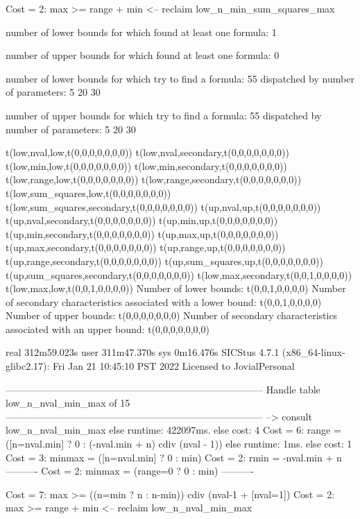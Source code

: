Cost =  2:  max >= range + min
<-- reclaim low_n_min_sum_squares_max

number of lower bounds for which found at least one formula: 1

number of upper bounds for which found at least one formula: 0

number of lower bounds for which try to find a formula: 55
dispatched by number of parameters: 5  20  30

number of upper bounds for which try to find a formula: 55
dispatched by number of parameters: 5  20  30

t(low,nval,low,t(0,0,0,0,0,0,0))
t(low,nval,secondary,t(0,0,0,0,0,0,0))
t(low,min,low,t(0,0,0,0,0,0,0))
t(low,min,secondary,t(0,0,0,0,0,0,0))
t(low,range,low,t(0,0,0,0,0,0,0))
t(low,range,secondary,t(0,0,0,0,0,0,0))
t(low,sum_squares,low,t(0,0,0,0,0,0,0))
t(low,sum_squares,secondary,t(0,0,0,0,0,0,0))
t(up,nval,up,t(0,0,0,0,0,0,0))
t(up,nval,secondary,t(0,0,0,0,0,0,0))
t(up,min,up,t(0,0,0,0,0,0,0))
t(up,min,secondary,t(0,0,0,0,0,0,0))
t(up,max,up,t(0,0,0,0,0,0,0))
t(up,max,secondary,t(0,0,0,0,0,0,0))
t(up,range,up,t(0,0,0,0,0,0,0))
t(up,range,secondary,t(0,0,0,0,0,0,0))
t(up,sum_squares,up,t(0,0,0,0,0,0,0))
t(up,sum_squares,secondary,t(0,0,0,0,0,0,0))
t(low,max,secondary,t(0,0,1,0,0,0,0))
t(low,max,low,t(0,0,1,0,0,0,0))
Number of lower bounds:                                             t(0,0,1,0,0,0,0)
Number of secondary characteristics associated with a lower bound:  t(0,0,1,0,0,0,0)
Number of upper bounds:                                             t(0,0,0,0,0,0,0)
Number of secondary characteristics associated with an upper bound: t(0,0,0,0,0,0,0)

real	312m59.023s
user	311m47.370s
sys	0m16.476s
SICStus 4.7.1 (x86_64-linux-glibc2.17): Fri Jan 21 10:45:10 PST 2022
Licensed to JovialPersonal


--------------------------------------------------------------------------------
Handle table low_n_nval_min_max of 15
--------------------------------------------------------------------------------
--> consult low_n_nval_min_max
else runtime: 422097ms. else cost: 4
Cost =  6:  range  = ([n=nval.min] ? 0 : (-nval.min + n) cdiv (nval - 1)) %
else runtime: 1ms. else cost: 1
Cost =  3:  minmax = ([n=nval.min] ? 0 : min) %
Cost =  2:  rmin   = -nval.min + n
----------
Cost =  2:  minmax = (range=0 ? 0 : min)
----------

Cost =  7:  max >= ((n=min ? n : n-min)) cdiv (nval-1 + [nval=1]) %
Cost =  2:  max >= range + min
<-- reclaim low_n_nval_min_max

